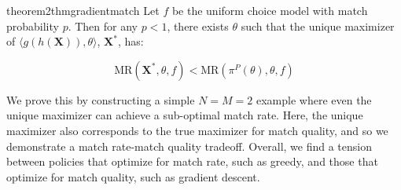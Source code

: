 \documentclass[11pt]{article}
\DeclareMathOperator*{\argmax}{arg\,max}
\begin{document}
\begin{restatable}{theorem2}{thmgradientmatch}
    \label{thm:gradient_match}
    Let $f$ be the uniform choice model with match probability $p$. Then for any $p<1$, there exists $\theta$ such that the unique maximizer of $\langle g(h(\mathbf{X})),\theta \rangle$, $\mathbf{X}^{*}$, has: 

    \begin{equation}
        \mathrm{MR}(\mathbf{X}^{*},\theta,f) < \mathrm{MR}(\pi^{P}(\theta),\theta,f)
    \end{equation}
\end{restatable}

We prove this by constructing a simple $N=M=2$ example where even the unique maximizer can achieve a sub-optimal match rate. 
Here, the unique maximizer also corresponds to the true maximizer for match quality, and so we demonstrate a match rate-match quality tradeoff. 
Overall, we find a tension between policies that optimize for match rate, such as greedy, and those that optimize for match quality, such as gradient descent. 
\end{document}
